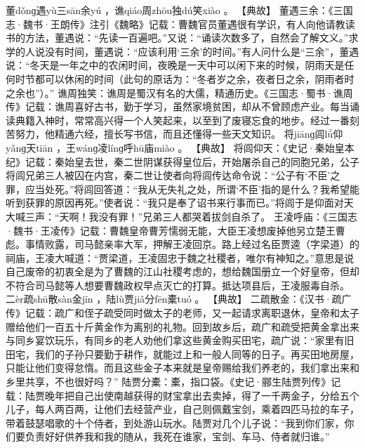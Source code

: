 \documentclass[12pt,UTF8]{ctexbook}
\begin{document}
董dǒnɡ遇yù三sān余yú
，谯qiáo周zhōu独dú笑xiào
。
【典故】
董遇三余：《三国志·魏书·王朗传》注引《魏略》记载：曹魏官员董遇很有学识，有人向他请教读书的方法，董遇说：“先读一百遍吧。”又说：“诵读次数多了，自然会了解文义。”求学的人说没有时间，董遇说：“应该利用‘三余’的时间。”有人问什么是“三余”，董遇说：“冬天是一年之中的农闲时间，夜晚是一天中可以闲下来的时候，阴雨天是任何时节都可以休闲的时间（此句的原话为：“冬者岁之余，夜者日之余，阴雨者时之余也”）。”
谯周独笑：谯周是蜀汉有名的大儒，精通历史。《三国志·蜀书·谯周传》记载：谯周喜好古书，勤于学习，虽然家境贫困，却从不曾顾虑产业。每当诵读典籍入神时，常常高兴得一个人笑起来，以至到了废寝忘食的地步。经过一番刻苦努力，他精通六经，擅长写书信，而且还懂得一些天文知识。
将jiānɡ闾lǘ仰yǎnɡ天tiān
，王wánɡ凌línɡ呼hū庙miào
。
【典故】
将闾仰天：《史记·秦始皇本纪》记载：秦始皇去世，秦二世阴谋获得皇位后，开始屠杀自己的同胞兄弟，公子将闾兄弟三人被囚在内宫，秦二世让使者向将闾传达命令说：“公子有‘不臣’之罪，应当处死。”将闾回答道：“我从无失礼之处，所谓‘不臣’指的是什么？我希望能听到获罪的原因再死。”使者说：“我只是奉了诏书来行事而已。”将闾于是仰面对天大喊三声：“天啊！我没有罪！”兄弟三人都哭着拔剑自杀了。
王凌呼庙：《三国志·魏书·王凌传》记载：曹魏皇帝曹芳懦弱无能，大臣王凌想废掉他另立楚王曹彪。事情败露，司马懿亲率大军，押解王凌回京。路上经过名臣贾逵（字梁道）的祠庙，王凌大喊道：“贾梁道，王凌固忠于魏之社稷者，唯尔有神知之。”意思是说自己废帝的初衷全是为了曹魏的江山社稷考虑的，想给魏国册立一个好皇帝，但却不符合司马懿等人想要曹魏政权早点灭亡的打算。抵达项县后，王凌服毒自杀。
二èr疏shū散sàn金jīn
，陆lù贾jiǎ分fēn橐tuó
。
【典故】
二疏散金：《汉书·疏广传》记载：疏广和侄子疏受同时做太子的老师，又一起请求离职退休，皇帝和太子赠给他们一百五十斤黄金作为离别的礼物。回到故乡后，疏广和疏受把黄金拿出来与同乡宴饮玩乐，有同乡的老人劝他们拿这些黄金购买田宅，疏广说：“家里有旧田宅，我们的子孙只要勤于耕作，就能过上和一般人同等的日子。再买田地房屋，只能让他们变得怠惰。而且这些金子本来就是皇帝赐给我们养老的，我们拿出来和乡里共享，不也很好吗？”
陆贾分橐：橐，指口袋。《史记·郦生陆贾列传》记载：陆贾晚年把自己出使南越获得的财宝拿出去卖掉，得了一千两金子，分给五个儿子，每人两百两，让他们去经营产业，自己则佩戴宝剑，乘着四匹马拉的车子，带着鼓瑟唱歌的十个侍者，到处游山玩水。陆贾对几个儿子说：“我到你们家，你们要负责好好供养我和我的随从，我死在谁家，宝剑、车马、侍者就归谁。”
\end{document}
